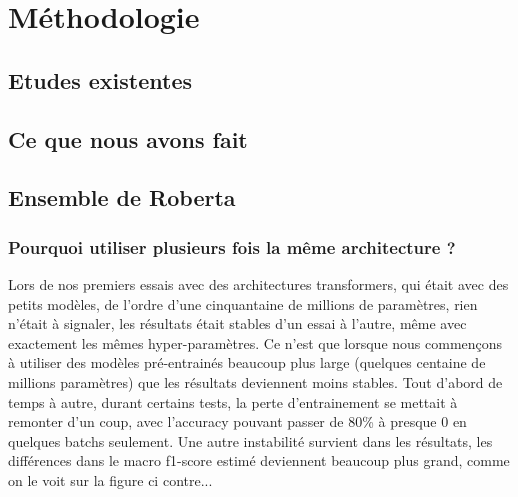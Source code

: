\chapter{Méthodologie}

\section{Etudes existentes}


\section{Ce que nous avons fait}



\section{Ensemble de Roberta}
\subsection{Pourquoi utiliser plusieurs fois la même architecture ?}
Lors de nos premiers essais avec des architectures transformers, qui était avec des petits modèles, de l'ordre d'une cinquantaine de millions de paramètres, rien n'était à signaler, les résultats était stables d'un essai à l'autre, même avec exactement les mêmes hyper-paramètres. Ce n'est que lorsque nous commençons à utiliser des modèles pré-entrainés beaucoup plus large (quelques centaine de millions paramètres) que les résultats deviennent moins stables. Tout d'abord de temps à autre, durant certains tests, la perte d'entrainement se mettait à remonter d'un coup, avec l'accuracy pouvant passer de 80\% à presque 0 en quelques batchs seulement. Une autre instabilité survient dans les résultats, les différences dans le macro f1-score estimé deviennent beaucoup plus grand, comme on le voit sur la figure ci contre...

